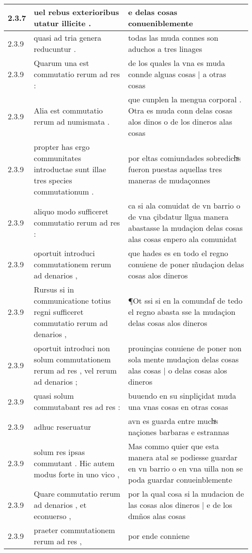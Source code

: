 \begin{tabular}{|p{1cm}|p{6.5cm}|p{6.5cm}|}
2.3.7 & uel rebus exterioribus utatur illicite . & e delas cosas conueniblemente \\\hline
2.3.9 & quasi ad tria genera reducuntur . & todas las muda connes son aduchos a tres linages \\\hline
2.3.9 & Quarum una est commutatio rerum ad res : & de los quales la vna es muda connde alguas cosas | a otras cosas \\\hline
2.3.9 & Alia est commutatio rerum ad numismata . & que cunplen la mengua corporal . Otra es muda conn delas cosas alos dinos o de los dineros alas cosas \\\hline
2.3.9 & propter has ergo communitates introductae sunt illae tres species commutationum . & por eltas comiundades sobredichͣs fueron puestas aquellas tres maneras de mudaçonnes \\\hline
2.3.9 & aliquo modo sufficeret commutatio rerum ad res : & ca si ala comuidat de vn barrio o de vna çibdatur llgua manera abastasse la mudaçion delas cosas alas cosas enpero ala comunidat \\\hline
2.3.9 & oportuit introduci commutationem rerum ad denarios , & que hades es en todo el regno conuiene de poner m̃udaçion delas cosas alos dineros \\\hline
2.3.9 & Rursus si in communicatione totius regni sufficeret commutatio rerum ad denarios , & ¶Ot ssi si en la comundaf de tedo el regno abasta sse la mudaçion delas cosas alos dineros \\\hline
2.3.9 & oportuit introduci non solum commutationem rerum ad res , vel rerum ad denarios ; & prouinçias conuiene de poner non sola mente mudaçion delas cosas alas cosas | o delas cosas alos dineros \\\hline
2.3.9 & quasi solum commutabant res ad res : & buuendo en su sinpliçidat muda una vnas cosas en otras cosas \\\hline
2.3.9 & adhuc reseruatur & avn es guarda entre muchͣs naçiones barbaras e estrannas \\\hline
2.3.9 & solum res ipsas commutant . Hic autem modus forte in uno vico , & Mas commo quier que esta manera atal se podiesse guardar en vn barrio o en vna uilla non se poda guardar conueinblemente \\\hline
2.3.9 & Quare commutatio rerum ad denarios , et econuerso , & por la qual cosa si la mudacion de las cosas alos dineros | e de los dmños alas cosas \\\hline
2.3.9 & praeter commutationem rerum ad res , & por ende conniene \\\hline

\end{tabular}
